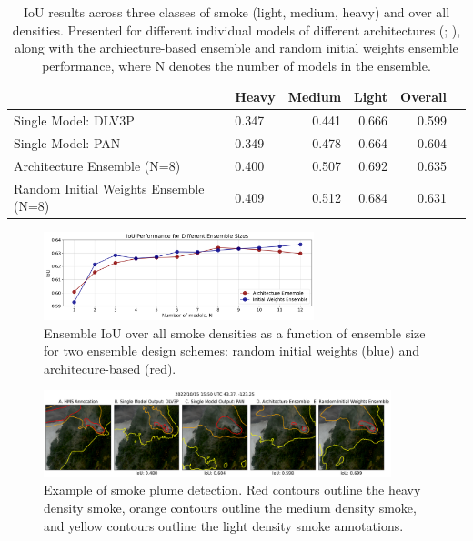 \documentclass{article}
\begin{document}
\begin{table}[h]
    \centering
    \begin{tabular}{llrrr>{\bfseries}r}
        \hline
            &   Heavy &   Medium &   Light &   Overall \\
        \hline
         Single Model: DLV3P &   0.347 &     0.441 &  0.666 &      0.599  \\
         Single Model: PAN &  0.349 &     0.478 &  0.664 &      0.604 \\
        \rowcolor{gray!10} Architecture Ensemble (N=8) &   0.400 &     0.507 &  0.692 &      0.635 \\
        \rowcolor{gray!10} Random Initial Weights Ensemble (N=8) &  0.409 &     0.512 &  0.684 &      0.631 \\
         \hline
    \end{tabular}
    \caption{IoU results across three classes of smoke (light, medium, heavy) and over all densities. Presented for different individual models of different architectures (\citep{dlv3p}; \citep{PAN}), along with the archiecture-based ensemble and random initial weights ensemble performance, where N denotes the number of models in the ensemble.}
    \label{tab:results}
    \end{table}
\begin{figure}[h]
    \centering
    \includegraphics[width=0.70\textwidth]{ensemble_size_plot.png}
    \caption{Ensemble IoU over all smoke densities as a function of ensemble size for two ensemble design schemes: random initial weights (blue) and architecure-based (red).}
    \label{fig:ensemble_size_plot}
\end{figure}
\begin{figure}[h!]
    \centering
    \includegraphics[width=0.9\textwidth]{ensemble_panel_tinypaper.png}
    \caption{Example of smoke plume detection. Red contours outline the heavy density smoke, orange contours outline the medium density smoke, and yellow contours outline the light density smoke annotations. 
    }
    \label{fig:ensemble_panel}
\end{figure}
\end{document}
